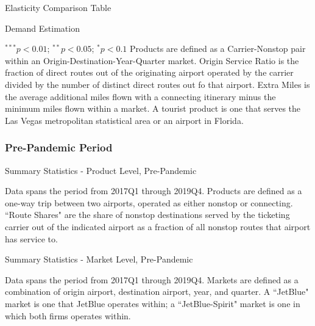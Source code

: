\documentclass{article}
\begin{document}
\begin{appendices}
	
	\begin{table}[h]
		\caption{Elasticity Comparison Table}
		\label{tab:ElasticityComparison}
		
	\end{table}
	
	\begin{table}
		\caption{Demand Estimation}
		\label{tab:DemandEstimation_OriginalInstruments}
		
		\footnotesize{$^{***}p<0.01$; $^{**}p<0.05$; $^{*}p<0.1$ Products are defined as a Carrier-Nonstop pair within an Origin-Destination-Year-Quarter market. Origin Service Ratio is the fraction of direct routes out of the originating airport operated by the carrier divided by the number of distinct direct routes out fo that airport. Extra Miles is the average additional miles flown with a connecting itinerary minus the minimum miles flown within a market.  A tourist product is one that serves the Las Vegas metropolitan statistical area or an airport in Florida.}
	\end{table}
	
	
	\FloatBarrier
	
	\subsubsection{Pre-Pandemic Period}
	
	\begin{table}
		\caption{Summary Statistics - Product Level, Pre-Pandemic}
		\label{tab:SummaryStatistics_Products_Pre}
		
		\footnotesize{Data spans the period from 2017Q1 through 2019Q4. Products are defined as a one-way trip between two airports, operated as either nonstop or connecting. ``Route Shares" are the share of nonstop destinations served by the ticketing carrier out of the indicated airport as a fraction of all nonstop routes that airport has service to.}
	\end{table}
	
	\begin{table}
		\caption{Summary Statistics - Market Level, Pre-Pandemic}
		\label{tab:SummaryStatistics_Market_Pre}
		
		\footnotesize{Data spans the period from 2017Q1 through 2019Q4. Markets are defined as a combination of origin airport, destination airport, year, and quarter. A ``JetBlue" market is one that JetBlue operates within; a ``JetBlue-Spirit" market is one in which both firms operates within. }
	\end{table}
	

\end{appendices}
\end{document}
